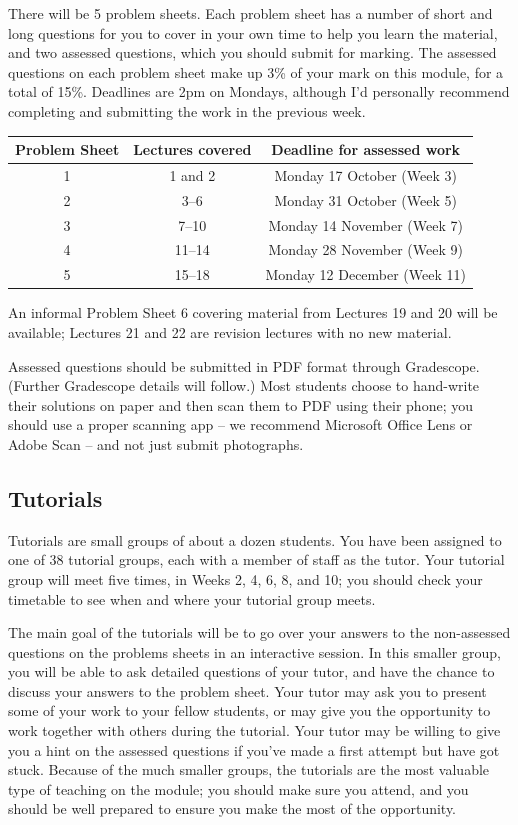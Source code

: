 \documentclass[
  letterpaper,
  DIV=11,
  numbers=noendperiod]{scrreprt}
\theoremstyle{remark}
\begin{document}
There will be 5 problem sheets. Each problem sheet has a number of short
and long questions for you to cover in your own time to help you learn
the material, and two assessed questions, which you should submit for
marking. The assessed questions on each problem sheet make up 3\% of
your mark on this module, for a total of 15\%. Deadlines are 2pm on
Mondays, although I'd personally recommend completing and submitting the
work in the previous week.

\begin{longtable}[]{@{}ccc@{}}
\toprule()
Problem Sheet & Lectures covered & Deadline for assessed work \\
\midrule()
\endhead
1 & 1 and 2 & Monday 17 October (Week 3) \\
2 & 3--6 & Monday 31 October (Week 5) \\
3 & 7--10 & Monday 14 November (Week 7) \\
4 & 11--14 & Monday 28 November (Week 9) \\
5 & 15--18 & Monday 12 December (Week 11) \\
\bottomrule()
\end{longtable}

An informal Problem Sheet 6 covering material from Lectures 19 and 20
will be available; Lectures 21 and 22 are revision lectures with no new
material.

Assessed questions should be submitted in PDF format through Gradescope.
(Further Gradescope details will follow.) Most students choose to
hand-write their solutions on paper and then scan them to PDF using
their phone; you should use a proper scanning app -- we recommend
Microsoft Office Lens or Adobe Scan -- and not just submit photographs.

\hypertarget{tutorials}{%
\subsection*{Tutorials}\label{tutorials}}

Tutorials are small groups of about a dozen students. You have been
assigned to one of 38 tutorial groups, each with a member of staff as
the tutor. Your tutorial group will meet five times, in Weeks 2, 4, 6,
8, and 10; you should check your timetable to see when and where your
tutorial group meets.

The main goal of the tutorials will be to go over your answers to the
non-assessed questions on the problems sheets in an interactive session.
In this smaller group, you will be able to ask detailed questions of
your tutor, and have the chance to discuss your answers to the problem
sheet. Your tutor may ask you to present some of your work to your
fellow students, or may give you the opportunity to work together with
others during the tutorial. Your tutor may be willing to give you a hint
on the assessed questions if you've made a first attempt but have got
stuck. Because of the much smaller groups, the tutorials are the most
valuable type of teaching on the module; you should make sure you
attend, and you should be well prepared to ensure you make the most of
the opportunity.
\end{document}
